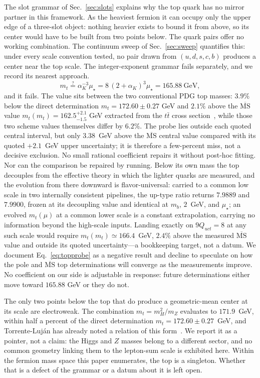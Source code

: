 \documentclass[aps,twocolumn,superscriptaddress,nofootinbib,floatfix]{revtex4-2}
\newcommand{\MSbar}{\overline{\mathrm{MS}}}
\newcommand{\mstar}{\mu_\star}
\newcommand{\alphaK}{\alpha_K}
\begin{document}
The slot grammar of Sec.~\ref{sec:slots} explains why the top quark has no mirror partner in this framework. As the heaviest fermion it can occupy only the upper edge of a three-slot object: nothing heavier exists to bound it from above, so its center would have to be built from two points below. The quark pairs offer no working combination. The continuum sweep of Sec.~\ref{sec:sweep} quantifies this: under every scale convention tested, no pair drawn from $(u,d,s,c,b)$ produces a center near the top scale. The integer-exponent grammar fails separately, and we record its nearest approach.
\begin{equation}
m_t\stackrel{?}{=}\alphaK^{-3}\mstar=8\,(2+\alphaK)^3\mstar=165.88\ \mathrm{GeV},
\label{eq:topprobe}
\end{equation}
and it fails. The value sits between the two conventional PDG top masses: $3.9\%$ below the direct determination $m_t=172.60\pm0.27$ GeV and $2.1\%$ above the $\MSbar$ value $m_t(m_t)=162.5^{+2.1}_{-1.5}$ GeV extracted from the $t\bar t$ cross section~\cite{PDG2026}, while those two scheme values themselves differ by $6.2\%$. The probe lies outside each quoted central interval, but only $3.38$~GeV above the $\MSbar$ central value compared with its quoted $+2.1$~GeV upper uncertainty; it is therefore a few-percent miss, not a decisive exclusion. No small rational coefficient repairs it without post-hoc fitting. Nor can the comparison be repaired by running. Below its own mass the top decouples from the effective theory in which the lighter quarks are measured, and the evolution from there downward is flavor-universal: carried to a common low scale in two internally consistent pipelines, the up-type ratio returns $7.9889$ and $7.9900$, frozen at its decoupling value and identical at $m_b$, $2$~GeV, and $\mstar$; an evolved $m_t(\mu)$ at a common lower scale is a constant extrapolation, carrying no information beyond the high-scale inputs. Landing exactly on $9Q_{uct}=8$ at any such scale would require $m_t(m_t)\simeq166.4$~GeV, $2.4\%$ above the measured $\MSbar$ value and outside its quoted uncertainty---a bookkeeping target, not a datum. We document Eq.~\eqref{eq:topprobe} as a negative result and decline to speculate on how the pole and $\MSbar$ top determinations will converge as the measurements improve. No coefficient on our side is adjustable in response: future determinations either move toward $165.88$ GeV or they do not.


The only two points below the top that do produce a geometric-mean center at its scale are electroweak. The combination $m_t=m_H^2/m_Z$ evaluates to $171.9$~GeV, within half a percent of the direct determination $m_t=172.60\pm0.27$~GeV, and Torrente-Luj\'an has already noted a relation of this form~\cite{TorrenteLujan2014}. We report it as a pointer, not a claim: the Higgs and $Z$ masses belong to a different sector, and no common geometry linking them to the lepton-sum scale is exhibited here. Within the fermion mass space this paper enumerates, the top is a singleton. Whether that is a defect of the grammar or a datum about it is left open.
\end{document}
